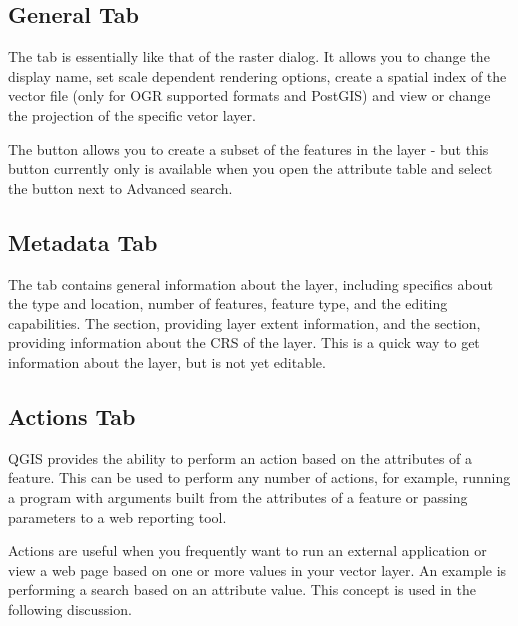 \subsection{General Tab}\label{vectorgeneraltab}

The  tab is essentially like that of the raster dialog. It
allows you to change the display name, set scale dependent rendering options,
create a spatial index of the vector file (only for OGR supported formats and
PostGIS) and view or change the projection of the specific vetor layer.

The  button allows you to create a subset of the
features in the layer - but this button currently only is available when you
open the attribute table and select the  button next to Advanced
search.

\subsection{Metadata Tab}

The  tab contains general information about the layer,
including specifics about the type and location, number of features, feature
type, and the editing capabilities. The  section,
providing
layer extent information, and the 
section, providing information about the CRS of the layer. This is a quick
way to get information about the layer, but is not yet editable.

\subsection{Actions Tab}\label{label_actions}

QGIS provides the ability to perform an action based on the attributes of a
feature. This can be used to perform any number of actions, for example,
running a program with arguments built from the attributes of a feature or
passing parameters to a web reporting tool.

Actions are useful when you frequently want to run an external application or
view a web page based on one or more values in your vector layer. An example
is performing a search based on an attribute value. This concept is used in 
the following discussion.


